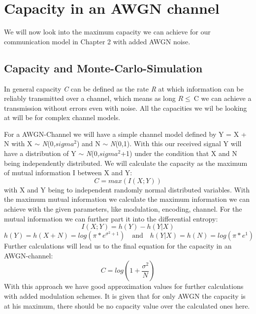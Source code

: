 \documentclass[12pt,oneside, reqno]{report}
\begin{document}
	
\newpage
\chapter{Capacity in an AWGN channel}

We will now look into the maximum capacity we can achieve for our communication model in Chapter 2 with added AWGN noise.

\section{Capacity and Monte-Carlo-Simulation}

In general capacity \textit{C} can be defined as the rate \textit{R} at which information can be reliably transmitted over a channel, which means as long $R \leq \ $C we can achieve a transmission without errors even with noise. All the capacities we wil be looking at will be for complex channel models.

For a AWGN-Channel we will have a simple channel model defined by Y = X + N with X $\sim$ \textit{N}(0,$sigma^2$) and N $\sim$ \textit{N}(0,1). With this our received signal Y will have a distribution of Y $\sim$ \textit{N}(0,$sigma^2$+1) under the condition that X and N being independently distributed.
We will calculate the capacity as the maximum of mutual information I between X and Y:
\begin{equation}
\label{metric}
C = max(I(X;Y))     
\end{equation}
with X and Y being to independent randomly normal distributed variables.
With the maximum mutual information we calculate the maximum information we can achieve with the given parameters, like modulation, encoding, channel. 
\newline
For the mutual information we can further part it into the differential entropy:
\begin{equation}
\label{metric}
I(X;Y) = h(Y) - h(Y|X)
\end{equation}
\newline
\begin{equation}
\label{metric}
h(Y) = h(X+N) = log(\pi*e^{\sigma^2+1}) \quad \textrm{and} \quad h(Y|X) = h(N) = log(\pi*e^{1})
\end{equation}
Further calculations will lead us to the final equation for the capacity in an AWGN-channel:
\begin{equation}
\label{metric}
C = log(1+\frac{\sigma^2}{N})
\end{equation}
With this approach we have good approximation values for further calculations with added modulation schemes. It is given that for only AWGN the capacity is at his maximum, there should be no capacity value over the calculated ones here. 
\end{document}
